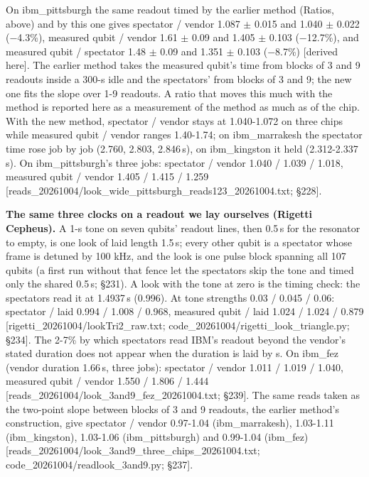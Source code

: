 \documentclass[11pt]{article}
\begin{document}
On ibm\_pittsburgh the same readout timed by the earlier method (Ratios, above) and by this one gives spectator / vendor 1.087 \(\pm\) 0.015 and 1.040 \(\pm\) 0.022 (\(-\)4.3\%), measured qubit / vendor 1.61 \(\pm\) 0.09 and 1.405 \(\pm\) 0.103 (\(-\)12.7\%), and measured qubit / spectator 1.48 \(\pm\) 0.09 and 1.351 \(\pm\) 0.103 (\(-\)8.7\%) {[}derived here{]}. The earlier method takes the measured qubit's time from blocks of 3 and 9 readouts inside a 300-\textmu s idle and the spectators' from blocks of 3 and 9; the new one fits the slope over 1-9 readouts. A ratio that moves this much with the method is reported here as a measurement of the method as much as of the chip. With the new method, spectator / vendor stays at 1.040-1.072 on three chips while measured qubit / vendor ranges 1.40-1.74; on ibm\_marrakesh the spectator time rose job by job (2.760, 2.803, 2.846\,\textmu s), on ibm\_kingston it held (2.312-2.337\,\textmu s). On ibm\_pittsburgh's three jobs: spectator / vendor 1.040 / 1.039 / 1.018, measured qubit / vendor 1.405 / 1.415 / 1.259 {[}reads\_20261004/look\_wide\_pittsburgh\_reads123\_20261004.txt; \S{}228{]}.

\textbf{The same three clocks on a readout we lay ourselves (Rigetti Cepheus).} A 1-\textmu s tone on seven qubits' readout lines, then 0.5\,\textmu s for the resonator to empty, is one look of laid length 1.5\,\textmu s; every other qubit is a spectator whose frame is detuned by 100 kHz, and the look is one pulse block spanning all 107 qubits (a first run without that fence let the spectators skip the tone and timed only the shared 0.5\,\textmu s; \S{}231). A look with the tone at zero is the timing check: the spectators read it at 1.4937\,\textmu s (0.996). At tone strengths 0.03 / 0.045 / 0.06: spectator / laid 0.994 / 1.008 / 0.968, measured qubit / laid 1.024 / 1.024 / 0.879 {[}rigetti\_20261004/lookTri2\_raw.txt; code\_20261004/rigetti\_look\_triangle.py; \S{}234{]}. The 2-7\% by which spectators read IBM's readout beyond the vendor's stated duration does not appear when the duration is laid by \textmu s. On ibm\_fez (vendor duration 1.66\,\textmu s, three jobs): spectator / vendor 1.011 / 1.019 / 1.040, measured qubit / vendor 1.550 / 1.806 / 1.444 {[}reads\_20261004/look\_3and9\_fez\_20261004.txt; \S{}239{]}. The same reads taken as the two-point slope between blocks of 3 and 9 readouts, the earlier method's construction, give spectator / vendor 0.97-1.04 (ibm\_marrakesh), 1.03-1.11 (ibm\_kingston), 1.03-1.06 (ibm\_pittsburgh) and 0.99-1.04 (ibm\_fez) {[}reads\_20261004/look\_3and9\_three\_chips\_20261004.txt; code\_20261004/readlook\_3and9.py; \S{}237{]}.
\end{document}
